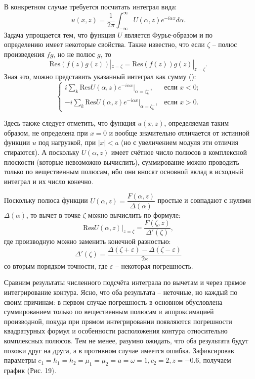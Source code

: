 \documentclass[a4paper, 12pt]{article}
\begin{document}
В конкретном случае требуется посчитать интеграл вида:
$$u(x,z)=\frac{1}{2\pi}\int^{\infty}_{-\infty} U(\alpha,z) e^{-i \alpha x } d\alpha.$$ 
Задача упрощается тем, что функция $U$ является Фурье-образом и по определению имеет некоторые свойства. Также известно, что если $\zeta$ -- полюс произведения $f g$, но не полюс $g$, то 
$$\mathrm{Res} \left(f(z)g(z)\right)|_{z=\zeta}=\mathrm{Res} \left(f(z)\right)g(z)|_{z=\zeta}.$$
Зная это, можно представить указанный интеграл как сумму (\cite{new}):
\[
\begin{cases}
i \sum_k \mathrm{Res}U(\alpha,z) e^{-i \alpha x}|_{\alpha=\zeta^+_k}, & \text{если $x<0$;} \\
-i \sum_k \mathrm{Res}U(\alpha,z) e^{-i \alpha x}|_{\alpha=\zeta^-_k}, & \text{если $x> 0$.}
\end{cases}
\]

Здесь также следует отметить, что функция $u(x,z)$, определяемая таким образом, не определена при $x=0$ и вообще значительно отличается от истинной функции $u$ под нагрузкой, при $|x|<a$ (но с увеличением модуля эти отличия стираются).
А поскольку $U(\alpha, z)$ имеет счётное число полюсов в комплексной плоскости (которые невозможно вычислить), суммирование можно проводить только по вещественным полюсам, ибо они вносят основной вклад в исходный интеграл и их число конечно.  

Поскольку полюса функции $U(\alpha,z)=\dfrac{F(\alpha,z)}{\Delta(\alpha)}$ простые и совпадают с нулями $\Delta(\alpha)$, то вычет в точке $\zeta$ можно вычислить по формуле:
$$\mathrm{Res} U(\alpha,z)|_{z=\zeta} =\dfrac{F(\zeta,z)}{\Delta' (\zeta)},$$
где производную можно заменить конечной разностью:
$$\Delta' (\zeta)=\dfrac{\Delta(\zeta + \varepsilon)-\Delta(\zeta- \varepsilon)}{2 \varepsilon}$$
со вторым порядком точности, где $\varepsilon$ -- некоторая погрешность.

Сравним результаты численного подсчёта интеграла по вычетам и через прямое интегрирование контура.
Ясно, что оба результата -- неточные, но каждый по своим причинам: в первом случае погрешность в основном обусловлена суммированием только по вещественным полюсам и аппроксимацией производной, покуда при прямом интегрировании появляются погрешности квадратурных формул и особенности расположения контура относительно комплексных полюсов.
Тем не менее, разумно ожидать, что оба результата будут похожи друг на друга, а в противном случае имеется ошибка. Зафиксировав параметры $c_1=h_1=h_2=\mu_1=\mu_2=a=\omega=1, c_2= 2, z=-0.6$, получаем график (Рис. 19).
\end{document}
